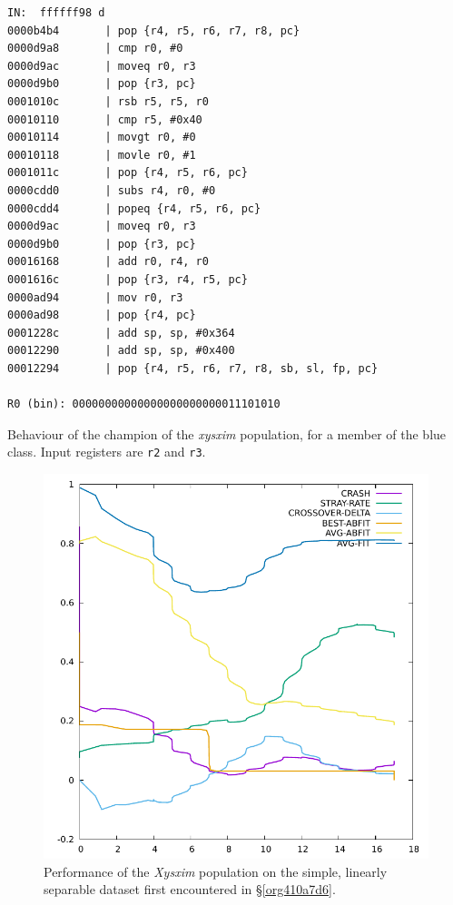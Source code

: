 \documentclass[12pt,glossary]{dalthesis}
\begin{document}
\begin{table}
\begin{lstlisting}
IN:  ffffff98 d
0000b4b4       | pop {r4, r5, r6, r7, r8, pc}
0000d9a8       | cmp r0, #0
0000d9ac       | moveq r0, r3
0000d9b0       | pop {r3, pc}
0001010c       | rsb r5, r5, r0
00010110       | cmp r5, #0x40
00010114       | movgt r0, #0
00010118       | movle r0, #1
0001011c       | pop {r4, r5, r6, pc}
0000cdd0       | subs r4, r0, #0
0000cdd4       | popeq {r4, r5, r6, pc}
0000d9ac       | moveq r0, r3
0000d9b0       | pop {r3, pc}
00016168       | add r0, r4, r0
0001616c       | pop {r3, r4, r5, pc}
0000ad94       | mov r0, r3
0000ad98       | pop {r4, pc}
0001228c       | add sp, sp, #0x364
00012290       | add sp, sp, #0x400
00012294       | pop {r4, r5, r6, r7, r8, sb, sl, fp, pc}

R0 (bin): 00000000000000000000000011101010
\end{lstlisting}
\caption{Behaviour of the champion of the \emph{xysxim} population, for a member of the blue class. Input registers are \texttt{r2} and \texttt{r3}.}
\label{tab:xysxim-champ-blue}
\end{table}

\begin{figure}[htbp]
\centering
\includegraphics[width=.9\linewidth]{../images/plots/xysxim.pdf}
\caption{\label{fig:org0035121}
Performance of the \emph{Xysxim} population on the simple, linearly separable dataset first encountered in \S \ref{org410a7d6}.}
\end{figure}
\end{document}
